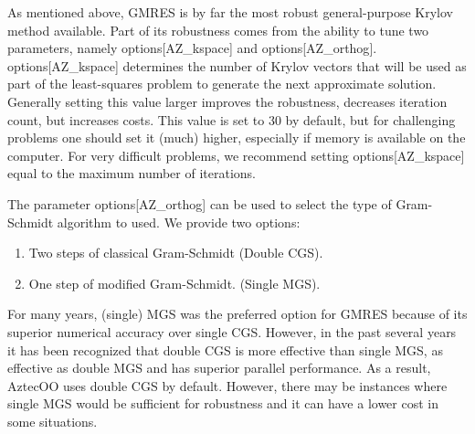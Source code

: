 \documentclass[12pt,relax]{AztecOOUserGuide}
\begin{document}
As mentioned above, GMRES is by far the most robust general-purpose
Krylov method available.  Part of its robustness comes from the
ability to tune two parameters, namely options[{\sf AZ\_kspace}] and
options[{\sf AZ\_orthog}]. options[{\sf AZ\_kspace}] determines the
number of Krylov vectors that will be used as part of the
least-squares problem to generate the next approximate solution.
Generally setting this value larger improves the robustness,
decreases iteration count, but increases costs. This value is set to
30 by default, but for challenging problems one should set it (much)
higher, especially if memory is available on the computer.  For very
difficult problems, we recommend setting options[{\sf AZ\_kspace}]
equal to the maximum number of iterations.

The parameter options[{\sf AZ\_orthog}] can be used to select the
type of Gram-Schmidt algorithm to used.  We provide two options:
\begin{enumerate}
  \item Two steps of classical Gram-Schmidt (Double CGS).

  \item One step of modified Gram-Schmidt. (Single MGS).
\end{enumerate}

For many years, (single) MGS was the preferred option for GMRES
because of its superior numerical accuracy over single CGS. However,
in the past several years it has been recognized that double CGS is
more effective than single MGS, as effective as double MGS and has
superior parallel performance.  As a result, AztecOO uses double CGS
by default.  However, there may be instances where single MGS would
be sufficient for robustness and it can have a lower cost in some
situations.
\end{document}
